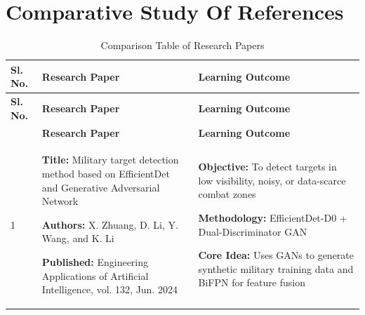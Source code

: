 \section{Comparative Study Of References}
\renewcommand{\arraystretch}{1.5}
\begin{center}
    \begin{longtable}{
        |>{\centering\arraybackslash}m{1.22cm}
        |>{\raggedright\arraybackslash}m{6.3cm}
        |>{\raggedright\arraybackslash}m{6.3cm}|
        }
        \caption{Comparison Table of Research Papers}                                                                                                                                      \\
        \hline
        \textbf{Sl. No.}                                                                             & \textbf{Research Paper} & \textbf{Learning Outcome}                                 \\
        \hline
        \endfirsthead
        \hline
        \textbf{Sl. No.}                                                                             & \textbf{Research Paper} & \textbf{Learning Outcome}                                 \\ \hline \endhead \endlastfoot \hline \multicolumn{1}{|c|}{\textbf{Sl. No.}} & \textbf{Research Paper} & \textbf{Learning Outcome} \\
        \hline
        \endhead
        \endlastfoot

        1                                                                                            &
        \textbf{Title:} Military target detection method based on EfficientDet and Generative Adversarial Network \par
        \textbf{Authors:} X. Zhuang, D. Li, Y. Wang, and K. Li \par
        \textbf{Published:} Engineering Applications of Artificial Intelligence, vol. 132, Jun. 2024 &
        \textbf{Objective:} To detect targets in low visibility, noisy, or data-scarce combat zones \par
        \textbf{Methodology:} EfficientDet-D0 + Dual-Discriminator GAN \par
        \textbf{Core Idea:} Uses GANs to generate synthetic military training data and BiFPN for feature fusion                                                                            \\
        \hline


\end{longtable}
\end{center}
